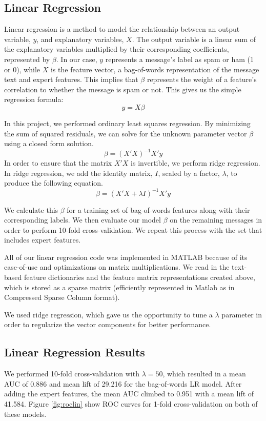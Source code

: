 \documentclass[preprint]{acm_proc_article-sp}
\begin{document}
\subsection{Linear Regression}

Linear regression is a method to model the relationship between an output variable, 
$y$, and explanatory variables, $X$. The output variable is a linear sum of the explanatory 
variables multiplied by their corresponding coefficients, represented by $\beta$. 
In our case, $y$ represents a message's label as spam or ham (1 or 0), 
while $X$ is the feature vector, a bag-of-words representation of the message text and expert features. 
This implies that $\beta$ represents the weight of a feature's correlation to whether 
the message is spam or not. This gives us the simple regression formula: $$y=X\beta$$

In this project, we performed ordinary least squares regression. By minimizing the sum of squared 
residuals, we can solve for the unknown parameter vector $\beta$ using a closed form solution. 
$$\beta=(X'X)^{-1}X'y$$ In order to ensure that the matrix $X'X$ is invertible, we perform ridge regression. 
In ridge regression, we add the identity matrix, $I$, scaled by a factor, $\lambda$, to 
produce the following equation. $$\beta=(X'X+\lambda I)^{-1}X'y$$

We calculate this $\beta$ for a training set of bag-of-words features along with their corresponding labels. 
We then evaluate our model $\beta$ on the remaining messages in order to perform 10-fold cross-validation. 
We repeat this process with the set that includes expert features.

All of our linear regression code was implemented in MATLAB because of its ease-of-use 
and optimizations on matrix multiplications. We read in the text-based feature dictionaries and the feature matrix
representations created above, which is stored as a sparse matrix (efficiently represented in Matlab as 
in Compressed Sparse Column format).

We used ridge regression, which gave us the opportunity to tune a $\lambda$ parameter in order to 
regularize the vector components for better performance. 

\subsection{Linear Regression Results}

We performed 10-fold cross-validation with $\lambda=50$, which resulted in a mean AUC of 0.886 and mean lift of 
29.216 for the bag-of-words LR model. After adding the expert features, the mean AUC climbed to 0.951 with a mean 
lift of 41.584. Figure \ref{fig:roclin} show ROC curves for 1-fold cross-validation on both of these models.
\end{document}
